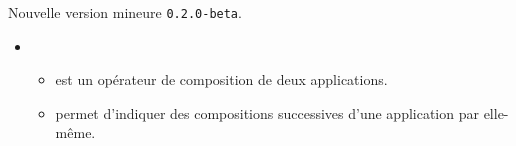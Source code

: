 Nouvelle version mineure \verb+0.2.0-beta+.

\begin{itemize}[itemsep=.5em]
    \item {}
    \begin{itemize}[itemsep=.5em]
        \item {} est un opérateur de composition de deux applications.

        \item {} permet d'indiquer des compositions successives d'une application par elle-même.
    \end{itemize}
\end{itemize}

\separation
